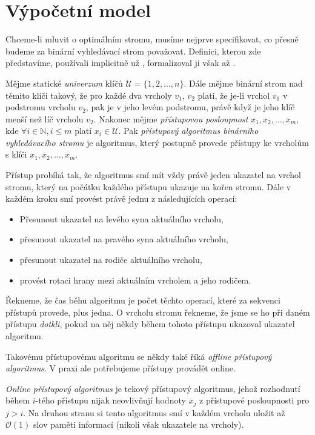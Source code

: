 \section{Výpočetní model}
Chceme-li mluvit o optimálním stromu, musíme nejprve specifikovat, co přesně
budeme za binární vyhledávací strom považovat. Definici, kterou zde
představíme, používali implicitně už \citet{splay}, formalizoval ji však až
\citet{tango}.



\begin{definice}
Mějme statické \emph{univerzum} klíčů $\mathcal U = \{1,2,\dots,n\}$. Dále
mějme binární strom nad těmito klíči takový, že pro každé dva vrcholy $v_1$,
$v_2$ platí, že je-li vrchol $v_1$ v podstromu vrcholu $v_2$, pak je v jeho
levém podstromu, právě když je jeho klíč menší než líč vrcholu $v_2$. Nakonec
mějme \emph{přístupovou posloupnost} $x_1,x_2,\dots,x_m$, kde $\forall i \in
\mathbb N, i\leq m$ platí $x_i\in \mathcal U$. Pak \emph{přístupový algoritmus
binárního vyhledávacího stromu} je algoritmus, který postupně provede přístupy
ke vrcholům s klíči $x_1, x_2,\dots,x_m$.

Přístup probíhá tak, že algoritmus smí mít vždy právě jeden ukazatel na vrchol
stromu, který na počátku každého přístupu ukazuje na kořen stromu. Dále v
každém kroku smí provést právě jednu z následujících operací: 
\begin{itemize}
\item Přesunout ukazatel na levého syna aktuálního vrcholu,
\item přesunout ukazatel na pravého syna aktuálního vrcholu,
\item přesunout ukazatel na rodiče aktuálního vrcholu,
\item provést rotaci hrany mezi aktuálním vrcholem a jeho rodičem.
\end{itemize}

Řekneme, že čas běhu algoritmu je počet těchto operací, které za sekvenci
přístupů provede, plus jedna. O vrcholu stromu řekneme, že jsme se ho při daném
přístupu \emph{dotkli}, pokud na něj někdy během tohoto přístupu ukazoval
ukazatel algoritmu.  \end{definice}

Takovému přístupovému algoritmu se někdy také říká \emph{offline přístupový
algoritmus}. V praxi ale potřebujeme přístupy provádět online.

\begin{definice}
\emph{Online přístupový algoritmus} je tekový přístupový algoritmus, jehož
rozhodnutí během $i$-tého přístupu nijak neovlivňují hodnoty $x_j$ z přístupové
posloupnosti pro $j>i$. Na druhou stranu si tento algoritmus smí v každém
vrcholu uložit až $\mathcal O(1)$ slov paměti informací (nikoli však ukazatele
na vrcholy).  
\end{definice}

